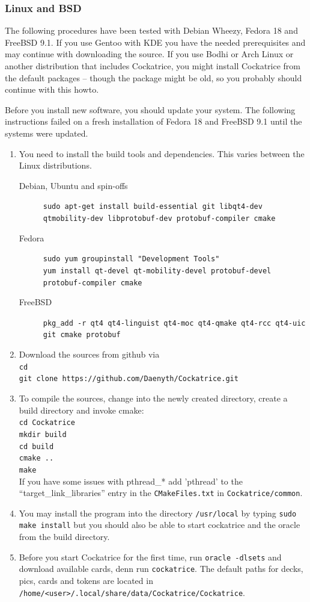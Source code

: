 \documentclass[a4paper]{scrbook}
\newcommand{\shellcmd}[1]{\texttt{\scriptsize #1}}
\begin{document}
\subsubsection{Linux and BSD}
The following procedures have been tested with Debian Wheezy, Fedora 18 and FreeBSD 9.1.
If you use Gentoo with KDE you have the needed prerequisites and may continue with downloading the source.
If you use Bodhi or Arch Linux or another distribution that includes Cockatrice, you might install Cockatrice from the default packages -- though the package might be old, 
so you probably should continue with this howto.

Before you install new software, you should update your system. The following instructions failed on a fresh installation of Fedora 18 and FreeBSD 9.1 until the systems were updated.
\begin{enumerate}
 \item You need to install the build tools and dependencies. This varies between the Linux distributions.
 \begin{description}
  \item[Debian, Ubuntu and spin-offs] \shellcmd{sudo apt-get install build-essential git libqt4-dev qtmobility-dev libprotobuf-dev protobuf-compiler cmake}
  \item[Fedora] \shellcmd{sudo yum groupinstall "Development Tools"\\
  yum install qt-devel qt-mobility-devel protobuf-devel protobuf-compiler cmake}
  \item[FreeBSD] \shellcmd{pkg\_add -r qt4 qt4-linguist qt4-moc qt4-qmake qt4-rcc qt4-uic git cmake protobuf}
 \end{description}
 \item Download the sources from github via \\ \shellcmd{cd\\ git clone https://github.com/Daenyth/Cockatrice.git}
 \item To compile the sources, change into the newly created directory, create a build directory and invoke cmake:\\
 \shellcmd{cd Cockatrice \\
mkdir build \\
cd build \\
cmake ..\\
make}\\
If you have some issues with pthread\_* add 'pthread' to the ``target\_link\_libraries'' entry in the \shellcmd{CMakeFiles.txt} in \shellcmd{Cockatrice/common}.
 \item You may install the program into the directory \shellcmd{/usr/local} by typing \shellcmd{sudo make install} but you should also be able to start 
 cockatrice and the oracle from the build directory.
 \item Before you start Cockatrice for the first time, run \shellcmd{oracle -dlsets} and download available cards, denn run \shellcmd{cockatrice}.
The default paths for decks, pics, cards and tokens are located in \\ \shellcmd{/home/<user>/.local/share/data/Cockatrice/Cockatrice}.
\end{enumerate}
\end{document}
